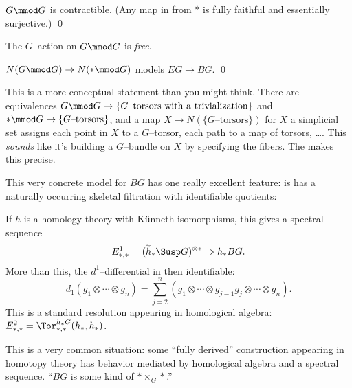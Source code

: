 \begin{lemma}
$G \mmod G$ is contractible.  (Any map in from $*$ is fully faithful and essentially surjective.) \qed
\end{lemma}

\begin{remark}
The $G$--action on $G \mmod G$ is \emph{free}.
\end{remark}

\begin{corollary}
$N(G \mmod G) \to N(* \mmod G)$ models $EG \to BG$. \qed
\end{corollary}

\begin{remark}
This is a more conceptual statement than you might think.  There are equivalences $G \mmod G \to \{\text{$G$--torsors with a trivialization}\}$ and $* \mmod G \to \{\text{$G$--torsors}\}$, and a map $X \to N(\{\text{$G$--torsors}\})$ for $X$ a simplicial set assigns each point in $X$ to a $G$--torsor, each path to a map of torsors, \ldots .  This \emph{sounds} like it's building a $G$--bundle on $X$ by specifying the fibers.  The  makes this precise.
\end{remark}

This very concrete model for $BG$ has one really excellent feature: is has a naturally occurring skeletal filtration with identifiable quotients:
\begin{center}
\end{center}
If $h$ is a homology theory with K\"unneth isomorphisms, this gives a spectral sequence \[E^1_{*, *} = (\widetilde h_* \Susp G)^{\otimes *} \Rightarrow h_* BG.\]  More than this, the $d^1$--differential in then identifiable: \[d_1(g_1 \otimes \cdots \otimes g_n) = \sum_{j=2}^n (g_1 \otimes \cdots \otimes g_{j-1} g_j \otimes \cdots \otimes g_n).\]  This is a standard resolution appearing in homological algebra: $E_{*, *}^2 = \Tor^{h_* G}_{*, *}(h_*, h_*)$.

\begin{remark}
This is a very common situation: some ``fully derived'' construction appearing in homotopy theory has behavior mediated by homological algebra and a spectral sequence.  ``$BG$ is some kind of $* \times_G *$.''
\end{remark}

